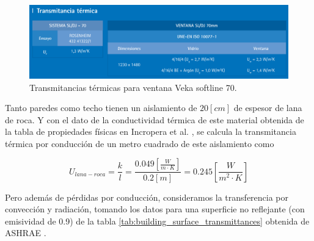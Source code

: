 \begin{figure}[h] \centering
	\centering
	\includegraphics[width=1\textwidth]{./capitulos/resultados_discusion/images/window_transmittance.png}
	\caption{Transmitancias térmicas para ventana Veka softline 70.}
	\label{fig:window_tranmittance}
\end{figure}


Tanto paredes como techo tienen un aislamiento de $20[cm]$ de espesor de lana
de roca. Y con el dato de la conductividad térmica de este material obtenida de
la tabla de propiedades físicas en Incropera et al.
\cite{incropera1996fundamentals}, se calcula la transmitancia térmica por
conducción de un metro cuadrado de este aislamiento como


\begin{equation}
	U_{lana-roca} = \frac{k}{l} = \frac{0.049\left[\frac{W}{m \cdot K}\right]}{0.2[m]} = 0.245 \left[\frac{W}{m^2 \cdot K}\right]
\end{equation}

Pero además de pérdidas por conducción, consideramos la transferencia por
convección y radiación, tomando los datos para una superficie no reflejante
(con emisividad de 0.9) de la tabla \ref{tab:building_surface_transmittances}
obtenida de ASHRAE \cite{refrigerating2009ashrae}.

